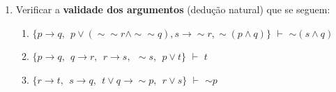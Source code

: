 \documentclass[12pt, a4paper,final]{article}
\begin{document}
\begin{enumerate}

\itemsep 1cm

\item Verificar a \textbf{validade dos argumentos} (dedu\c c\~ao natural) que se seguem: %

\begin{enumerate}




\item $\{ p \rightarrow q, \:\: p \vee (\sim \sim r \wedge \sim \sim  q), s \rightarrow \sim r, \sim (p \wedge q) \}$ {\bf $\vdash $} $\sim (s \wedge q)$



\item $\{ p \rightarrow q, \:\: q \rightarrow r, \:\: r \rightarrow s, \:\: \sim s, \:\: p \vee t \}$ {\bf $\vdash $} $t$







\item $\{ r \rightarrow t, \:\:  s \rightarrow q, \:\: t \vee q \rightarrow \sim p, \:\:  r \vee s \}$ {\bf $\vdash $} $ \sim p$




\end{enumerate}
\end{enumerate}
\end{document}
